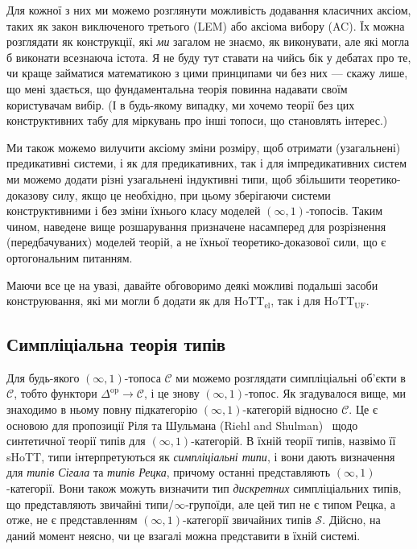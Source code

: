 \documentclass[12pt]{article}
\newcommand*{\calC}{\mathcal{C}}
\newcommand*{\calS}{\mathcal{S}}
\newcommand*{\inftyone}{\ensuremath{(\infty,1)}}
\newcommand*{\op}{^{\mathrm{op}}}
\newcommand*{\HoTTel}{HoTT$_{\mathrm{el}}$}
\newcommand*{\HoTTuf}{HoTT$_{\mathrm{UF}}$}
\begin{document}
Для кожної з них ми можемо розглянути можливість додавання класичних аксіом, таких як закон виключеного третього (LEM) або аксіома вибору (AC). Їх можна розглядати як конструкції, які \emph{ми} загалом не знаємо, як виконувати, але які могла б виконати всезнаюча істота. Я не буду тут ставати на чийсь бік у дебатах про те, чи краще займатися математикою з цими принципами чи без них — скажу лише, що мені здається, що фундаментальна теорія повинна надавати своїм користувачам вибір. (І в будь-якому випадку, ми хочемо теорії без цих конструктивних табу для міркувань про інші топоси, що становлять інтерес.)

Ми також можемо вилучити аксіому зміни розміру, щоб отримати (узагальнені) предикативні системи, і як для предикативних, так і для імпредикативних систем ми можемо додати різні узагальнені індуктивні типи, щоб збільшити теоретико-доказову силу, якщо це необхідно, при цьому зберігаючи системи конструктивними і без зміни їхнього класу моделей \inftyone-топосів. Таким чином, наведене вище розшарування призначене насамперед для розрізнення (передбачуваних) моделей теорій, а не їхньої теоретико-доказової сили, що є ортогональним питанням.

Маючи все це на увазі, давайте обговоримо деякі можливі подальші засоби конструювання, які ми могли б додати як для \HoTTel{}, так і для \HoTTuf.

\subsection{Симпліціальна теорія типів}

Для будь-якого \inftyone-топоса $\calC$ ми можемо розглядати симпліціальні об'єкти в $\calC$, тобто функтори $\Delta\op \to \calC$, і це знову \inftyone-топос. Як згадувалося вище, ми знаходимо в ньому повну підкатегорію \inftyone-категорій відносно $\calC$. Це є основою для пропозиції Ріля та Шульмана (Riehl and Shulman)~\cite{RiehlShulman2017} щодо синтетичної теорії типів для \inftyone-категорій. В їхній теорії типів, назвімо її sHoTT, типи інтерпретуються як \emph{симпліціальні типи}, і вони дають визначення для \emph{типів Сігала} та \emph{типів Рецка}, причому останні представляють \inftyone-категорії. Вони також можуть визначити тип \emph{дискретних} симпліціальних типів, що представляють звичайні типи/$\infty$-групоїди, але цей тип не є типом Рецка, а отже, не є представленням \inftyone-категорії звичайних типів $\calS$. Дійсно, на даний момент неясно, чи це взагалі можна представити в їхній системі.
\end{document}
